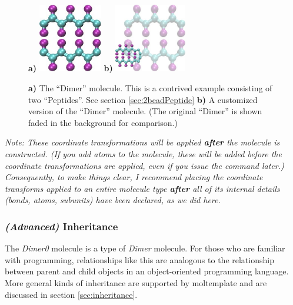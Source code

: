 \documentclass[11pt]{article}
\begin{document}
\begin{figure}[htbp]
\centering
\textbf{a)}
\includegraphics[height=3cm]{dimer_LR.jpg}
\hspace{1cm}
\textbf{b)}
\includegraphics[height=3cm]{dimer+dimer0_transparent_LR.jpg}
\caption{
\label{fig:dimers}
\textbf{a)}
The ``Dimer'' molecule.  This is a contrived example consisting of
two ``Peptides''.  See section \ref{sec:2beadPeptide}
\textbf{b)}
A customized version of the ``Dimer'' molecule.  
(The original ``Dimer'' is shown faded in the background for comparison.)
}
\end{figure}

  

\textit{Note: These coordinate transformations will be 
applied \textbf{after} the molecule is constructed.
(If you add atoms to the molecule, these will be added before
the coordinate transformations are applied,
even if you issue the command later.)
Consequently, to make things clear, 
I recommend placing the coordinate transforms applied to 
an entire molecule type \textbf{after} all of its internal details 
(bonds, atoms, subunits) have been declared, as we did here.}

\subsubsection*{\textit{(Advanced)} Inheritance}
\label{sec:inheritance_intro}
The \textit{Dimer0} molecule is a type of \textit{Dimer} molecule.
For those who are familiar with programming, 
relationships like this are analogous to the relationship 
between parent and child objects in an object-oriented programming language.
More general kinds of inheritance are supported by moltemplate
and are discussed in section \ref{sec:inheritance}.
\end{document}
